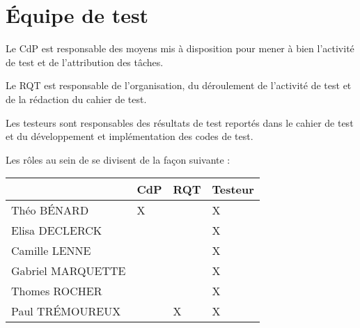 
\section{Équipe de test}
\label{sec:eqTest}

Le CdP est responsable des moyens mis à disposition pour mener à bien l'activité de test et de l'attribution des tâches.
\medskip

Le RQT est responsable de l'organisation, du déroulement de l'activité de test et de la rédaction du cahier de test.
\medskip

Les testeurs sont responsables des résultats de test reportés dans le cahier de test et du développement et implémentation des codes de test.

Les rôles au sein de {\equipe} se divisent de la façon suivante :
\noindent\begin{longtable}[c]{|p{8cm}|p{1.5cm}|p{1.5cm}|p{1.5cm}|}
\hline
    & {\bf CdP} & {\bf RQT} & {\bf Testeur} \\
\hline
Théo BÉNARD & X &   & X \\
\hline
Elisa DECLERCK &   &   & X \\
\hline
Camille LENNE &   &   & X \\
\hline
Gabriel MARQUETTE &   &   & X \\
\hline
Thomes ROCHER &   &   & X \\
\hline
Paul TRÉMOUREUX &   & X & X \\
\hline
\end{longtable}